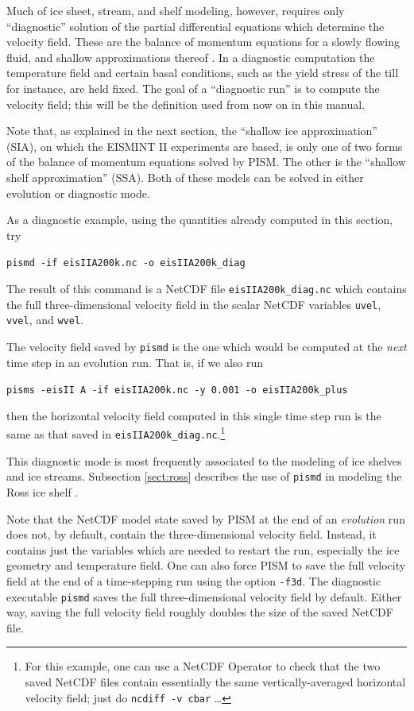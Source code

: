\documentclass[11pt,final]{amsart}
\renewcommand{\t}[1]{\texttt{#1}}
\newcommand{\pismoptionindex}[1]{\index{options for PISM (and PETSc)!\texttt{-#1}}}
\newcommand{\intextoption}[1]{\texttt{-#1}\pismoptionindex{#1}}
\begin{document}
Much of ice sheet, stream, and shelf modeling, however, requires only ``diagnostic'' solution of the partial differential equations which determine the velocity field.  These are the balance of momentum equations for a slowly flowing fluid, and shallow approximations thereof \cite{Fowler}.  In a diagnostic computation the temperature field and certain basal conditions, such as the yield stress of the till for instance, are held fixed.  The goal of a ``diagnostic run'' is to compute the velocity field; this will be the definition used from now on in this manual.

Note that, as explained in the next section, the ``shallow ice approximation'' (SIA), on which the EISMINT II experiments are based, is only one of two forms of the balance of momentum equations solved by PISM.  The other is the ``shallow shelf approximation'' (SSA).  Both of these models can be solved in either evolution or diagnostic mode.

As a diagnostic example, using the quantities already computed in this section, try

\verb|pismd -if eisIIA200k.nc -o eisIIA200k_diag|

\noindent The result of this command is a NetCDF file \verb|eisIIA200k_diag.nc| which contains the full three-dimensional velocity field in the scalar NetCDF variables \verb|uvel|, \verb|vvel|, and \verb|wvel|.

The velocity field saved by \verb|pismd| is the one which would be computed at the \emph{next} time step in an evolution run.  That is, if we also run

\verb|pisms -eisII A -if eisIIA200k.nc -y 0.001 -o eisIIA200k_plus|

\noindent then the horizontal velocity field computed in this single time step run is the same as that saved in \verb|eisIIA200k_diag.nc|.\footnote{For this example, one can use a NetCDF Operator to check that the two saved NetCDF files contain essentially the same vertically-averaged horizontal velocity field; just do \t{ncdiff -v cbar} \dots}

This diagnostic mode is most frequently associated to the modeling of ice shelves and ice streams.  Subsection \ref{sect:ross} describes the use of \verb|pismd| in modeling the Ross ice shelf \cite{MacAyealetal}.

Note that the NetCDF model state saved by PISM at the end of an \emph{evolution} run does not, by default, contain the three-dimensional velocity field.  Instead, it contains just the variables which are needed to restart the run, especially the ice geometry and temperature field.  One can also force PISM to save the full velocity field at the end of a time-stepping run using the option \intextoption{f3d}.  The diagnostic executable \verb|pismd| saves the full three-dimensional velocity field by default.  Either way, saving the full velocity field roughly doubles the size of the saved NetCDF file.
\end{document}
